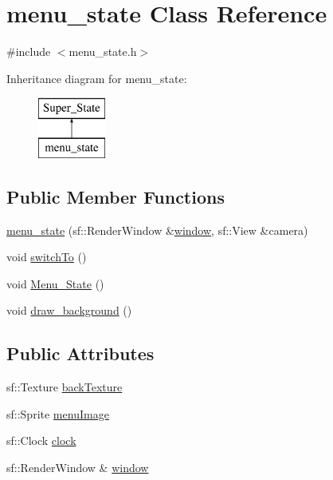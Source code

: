 \hypertarget{classmenu__state}{}\section{menu\+\_\+state Class Reference}
\label{classmenu__state}


{\ttfamily \#include $<$menu\+\_\+state.\+h$>$}

Inheritance diagram for menu\+\_\+state\+:\begin{figure}[H]
\begin{center}
\leavevmode
\includegraphics[height=2.000000cm]{classmenu__state}
\end{center}
\end{figure}
\subsection*{Public Member Functions}
\begin{DoxyCompactItemize}
\item 
\hyperlink{classmenu__state_a9b46b08734b75faa23cc44475a899679}{menu\+\_\+state} (sf\+::\+Render\+Window \&\hyperlink{classmenu__state_afa6e057ae20ebf8981364d97d08165a3}{window}, sf\+::\+View \&camera)
\item 
void \hyperlink{classmenu__state_af66bfdf9a0a01567637af139fdc77f5a}{switch\+To} ()
\item 
void \hyperlink{classmenu__state_accc17a76d43d17d4807b8c759c435dcc}{Menu\+\_\+\+State} ()
\item 
void \hyperlink{classmenu__state_a94de13d24de8872cd8819e6beaba0a4d}{draw\+\_\+background} ()
\end{DoxyCompactItemize}
\subsection*{Public Attributes}
\begin{DoxyCompactItemize}
\item 
sf\+::\+Texture \hyperlink{classmenu__state_a09398cebcf4c51159e5992f17d881fd7}{back\+Texture}
\item 
sf\+::\+Sprite \hyperlink{classmenu__state_ae4dd48b435e7941bdfc921a8f2945060}{menu\+Image}
\item 
sf\+::\+Clock \hyperlink{classmenu__state_a30e5272db9f1bc92913929d05c735803}{clock}
\item 
sf\+::\+Render\+Window \& \hyperlink{classmenu__state_afa6e057ae20ebf8981364d97d08165a3}{window}
\end{DoxyCompactItemize}

